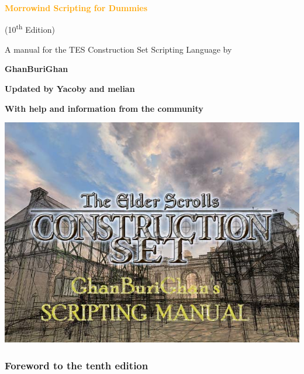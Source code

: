 \documentclass[oneside]{article}
\begin{document}

\begin{center}
	{\Huge \textcolor{orange}{\textbf{Morrowind Scripting for Dummies}}}
	
	\vspace{5mm}
	
	{\LARGE (10\textsuperscript{th} Edition)}
	
	\vspace{5mm}
	
	{\Large A manual for the TES Construction Set Scripting Language by
		
	\vspace{5mm}	
	
	\textbf{GhanBuriGhan}
	
	\textbf{Updated by Yacoby and melian}}

	{\large \textbf{With help and information from the community}}
\end{center}

\vspace{5mm}

\includegraphics{media/image1.png}

\clearpage

\tableofcontents
{}

\hypertarget{foreword-to-the-tenth-edition}{%
\subsubsection{\texorpdfstring{\hfill\break
Foreword to the tenth edition}{Foreword to the ninth edition}}\label{foreword-to-the-tenth-edition}}
\end{document}
